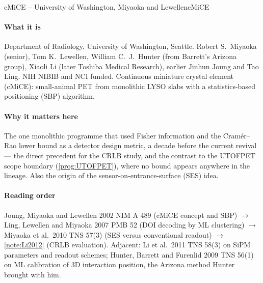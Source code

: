 
\begin{programnote}{cMiCE -- University of Washington, Miyaoka and Lewellen}{cMiCE}

\paragraph{What it is}
Department of Radiology, University of Washington, Seattle. Robert S.\ Miyaoka
(senior), Tom K.\ Lewellen, William C.\ J.\ Hunter (from Barrett's Arizona
group), Xiaoli Li (later Toshiba Medical Research), earlier Jinhun Joung and Tao
Ling. NIH NIBIB and NCI funded. Continuous miniature crystal element (cMiCE):
small-animal PET from monolithic LYSO slabs with a statistics-based positioning
(SBP) algorithm.

\paragraph{Why it matters here}
The one monolithic programme that used Fisher information and the Cramér--Rao
lower bound as a detector design metric, a decade before the current revival ---
the direct precedent for the CRLB study, and the contrast to the UTOFPET scope
boundary (\ref{prog:UTOFPET}), where no bound appears anywhere in the lineage.
Also the origin of the sensor-on-entrance-surface (SES) idea.

\paragraph{Reading order}
Joung, Miyaoka and Lewellen 2002 NIM A 489 (cMiCE concept and SBP)
$\rightarrow$ Ling, Lewellen and Miyaoka 2007 PMB 52 (DOI decoding by ML
clustering) $\rightarrow$ Miyaoka et al.\ 2010 TNS 57(3) (SES versus
conventional readout) $\rightarrow$ \ref{note:Li2012} (CRLB evaluation). Adjacent: Li et al.\ 2011 TNS 58(3) on SiPM parameters and readout
schemes; Hunter, Barrett and Furenlid 2009 TNS 56(1) on ML calibration of 3D
interaction position, the Arizona method Hunter brought with him.


\end{programnote}
